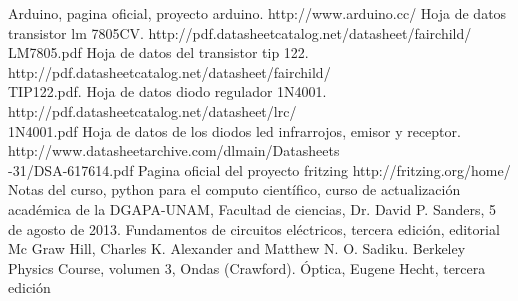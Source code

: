 \documentclass[12]{article}
\begin{document}
\begin{multicols}{2}
\begin{thebibliography}{99}
 Arduino, pagina oficial, proyecto arduino. http://www.arduino.cc/
 Hoja de datos  transistor lm 7805CV. http://pdf.datasheetcatalog.net/datasheet/fairchild/\\LM7805.pdf
 Hoja de datos del transistor tip 122. http://pdf.datasheetcatalog.net/datasheet/fairchild/\\TIP122.pdf.
  Hoja de datos diodo regulador 1N4001. http://pdf.datasheetcatalog.net/datasheet/lrc/\\1N4001.pdf
 Hoja de datos de los diodos led infrarrojos, emisor y receptor. \\ http://www.datasheetarchive.com/dlmain/Datasheets\\-31/DSA-617614.pdf
 Pagina oficial del proyecto fritzing http://fritzing.org/home/ 
 Notas del curso, python para el computo científico, curso de actualización académica de la DGAPA-UNAM, Facultad de ciencias, Dr. David P. Sanders, 5 de agosto de 2013. 
 Fundamentos de circuitos eléctricos, tercera edición, editorial Mc Graw Hill, Charles K. Alexander and Matthew N. O. Sadiku. 
 Berkeley Physics Course, volumen 3, Ondas (Crawford).
 Óptica, Eugene Hecht, tercera edición
\end{thebibliography}
\end{multicols}
\end{document}

